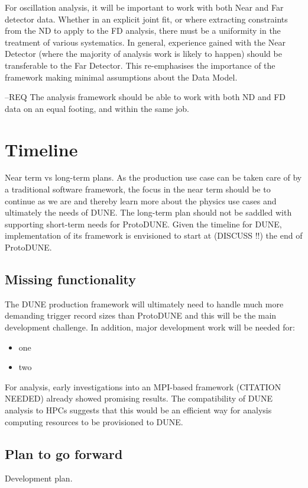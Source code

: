 \documentclass[../main-v1.tex]{subfiles}
\begin{document}
For oscillation analysis, it will be important to work with both Near and Far detector data. Whether in an explicit joint fit, or where extracting constraints from the ND to apply to the FD analysis, there must be a uniformity in the treatment of various systematics. In general, experience gained with the Near Detector (where the majority of analysis work is likely to happen) should be transferable to the Far Detector.  This re-emphasises the importance of the framework making minimal assumptions about the Data Model.

--REQ The analysis framework should be able to work with both ND and FD data on an equal footing, and within the same job.






\section{Timeline }

Near term vs long-term plans.  As the production use case can be taken care of by a traditional software framework, the focus in the near term should be to continue as we are and thereby learn more about the physics use cases and ultimately the needs of DUNE.  The long-term plan should not be saddled with supporting short-term needs for ProtoDUNE.  Given the timeline for DUNE, implementation of its framework is envisioned to start at (DISCUSS !!) the end of ProtoDUNE.

\subsection{Missing functionality }

The DUNE production framework will ultimately need to handle much more demanding trigger record sizes than ProtoDUNE and this will be the main development challenge.  In addition, major development work will be needed for:

\begin{itemize}
    \item one
    \item two
\end{itemize}

For analysis, early investigations into an MPI-based framework (CITATION NEEDED) already showed promising results.  The compatibility of DUNE analysis to HPCs suggests that this would be an efficient way for analysis computing resources to be provisioned to DUNE.

\subsection{Plan to go forward }

Development plan.

%
\end{document}
